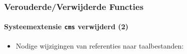 
\begin{frame}[fragile]
	\frametitle{Verouderde/Verwijderde Functies}
	\framesubtitle{Systeemextensie \texttt{cms} verwijderd (2)}

	\lstset{basicstyle=\tiny\ttfamily}

	\begin{itemize}

		\item Nodige wijzigingen van referenties naar taalbestanden:



\end{itemize}
\end{frame}
